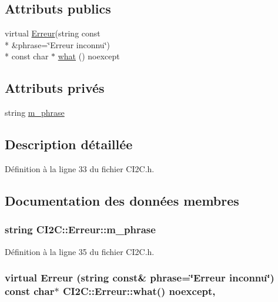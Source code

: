 \subsection*{Attributs publics}
\begin{DoxyCompactItemize}
\item 
virtual \hyperlink{class_c_i2_c_1_1_erreur}{Erreur}(string const \\*
\&phrase=\char`\"{}Erreur inconnu\char`\"{}) \\*
const char $\ast$ \hyperlink{class_c_i2_c_1_1_erreur_a72fc33a3697019d8261a3a00ac091f9f}{what} () noexcept
\end{DoxyCompactItemize}
\subsection*{Attributs privés}
\begin{DoxyCompactItemize}
\item 
string \hyperlink{class_c_i2_c_1_1_erreur_ac61872a33babfea899fa3f3feaedaf32}{m\+\_\+phrase}
\end{DoxyCompactItemize}


\subsection{Description détaillée}


Définition à la ligne 33 du fichier C\+I2\+C.\+h.



\subsection{Documentation des données membres}
\hypertarget{class_c_i2_c_1_1_erreur_ac61872a33babfea899fa3f3feaedaf32}{
\subsubsection[{m\+\_\+phrase}]{\setlength{\rightskip}{0pt plus 5cm}string C\+I2\+C\+::\+Erreur\+::m\+\_\+phrase\hspace{0.3cm}{\ttfamily [private]}}}\label{class_c_i2_c_1_1_erreur_ac61872a33babfea899fa3f3feaedaf32}


Définition à la ligne 35 du fichier C\+I2\+C.\+h.

\hypertarget{class_c_i2_c_1_1_erreur_a72fc33a3697019d8261a3a00ac091f9f}{
\subsubsection[{what}]{\setlength{\rightskip}{0pt plus 5cm}virtual {\bf Erreur} (string const\& phrase=\char`\"{}Erreur inconnu\char`\"{}) const char$\ast$ C\+I2\+C\+::\+Erreur\+::what() noexcept\hspace{0.3cm}{\ttfamily [inline]}, {\ttfamily [noexcept]}}}\label{class_c_i2_c_1_1_erreur_a72fc33a3697019d8261a3a00ac091f9f}


